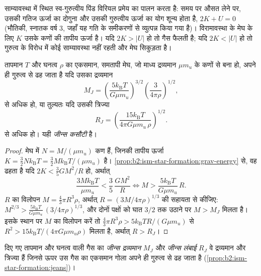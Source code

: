 साम्यावस्था में स्थित स्व-गुरुत्वीय पिंड विरियल प्रमेय का पालन करता है: समय पर
औसत लेने पर, उसकी गतिज ऊर्जा का दोगुना और उसकी गुरुत्वीय ऊर्जा का योग शून्य होता है,
$2K + U = 0$ (भौतिकी, स्नातक वर्ष 3, जहाँ यह गति के समीकरणों से
व्युत्पन्न किया गया है)। विरामावस्था के मेघ के लिए $K$ उसके कणों की तापीय ऊर्जा है।
यदि $2K > |U|$ हो तो गैस फैलती है; यदि $2K < |U|$ हो तो गुरुत्व के विरोध में कोई
साम्यावस्था नहीं रहती और मेघ सिकुड़ता है।

\begin{proposition}[जीन्स कसौटी]\label{prop:b2:ism-star-formation:jeans}
तापमान $T$ और घनत्व $\rho$ का एकसमान, समतापी मेघ, जो
माध्य द्रव्यमान $\mu m_u$ के कणों से बना हो, अपने ही गुरुत्व से ढह जाता है यदि उसका द्रव्यमान
\emph{}
\[
  M_J = \left(\frac{5 k_{\mathrm B} T}{G\mu m_u}\right)^{3/2}
        \left(\frac{3}{4\pi\rho}\right)^{1/2},
\]
से अधिक हो, या तुल्यतः यदि उसकी त्रिज्या \emph{}
\[
  R_J = \left(\frac{15 k_{\mathrm B} T}{4\pi G\mu m_u\,\rho}\right)^{1/2}.
\]
से अधिक हो। यही \emph{जीन्स कसौटी} है।
\end{proposition}

\begin{proof}
मेघ में $N = M/(\mu m_u)$ कण हैं, जिनकी तापीय ऊर्जा
$K = \tfrac32 N k_{\mathrm B}T = \tfrac32 M k_{\mathrm B}T/(\mu m_u)$ है।
\cref{prop:b2:ism-star-formation:grav-energy} से, वह ढहता है यदि
$2K < \tfrac35 GM^2/R$ हो, अर्थात्
\[
  \frac{3 M k_{\mathrm B} T}{\mu m_u} < \frac{3}{5}\,\frac{G M^2}{R}
  \iff M > \frac{5 k_{\mathrm B} T}{G \mu m_u}\, R .
\]
$R$ का विलोपन $M = \tfrac43\pi R^3\rho$, अर्थात् $R = (3M/4\pi\rho)^{1/3}$ की सहायता से कीजिए:
$M^{2/3} > \frac{5 k_{\mathrm B}T}{G\mu m_u}\,(3/4\pi\rho)^{1/3}$, और दोनों पक्षों को
घात $3/2$ तक उठाने पर $M > M_J$ मिलता है। इसके स्थान पर $M$ का विलोपन करें तो
$\tfrac43\pi R^3\rho > 5 k_{\mathrm B}T R/(G\mu m_u)$ से $R^2 > 15
k_{\mathrm B}T/(4\pi G\mu m_u\rho)$ मिलता है, अर्थात् $R > R_J$।
\end{proof}

\begin{definition}[जीन्स द्रव्यमान, जीन्स लंबाई]\label{def:b2:ism-star-formation:jeans}
दिए गए तापमान और घनत्व वाली गैस का \emph{जीन्स द्रव्यमान} $M_J$ और \emph{जीन्स
लंबाई} $R_J$ वे द्रव्यमान और त्रिज्या हैं
जिनसे ऊपर उस गैस का एकसमान गोला
अपने ही गुरुत्व से ढह जाता है (\cref{prop:b2:ism-star-formation:jeans})।
\end{definition}

